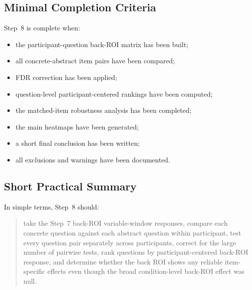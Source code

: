 \subsection{Minimal Completion Criteria}
Step~8 is complete when:
\begin{itemize}
    \item the participant-question back-ROI matrix has been built;
    \item all concrete-abstract item pairs have been compared;
    \item FDR correction has been applied;
    \item question-level participant-centered rankings have been computed;
    \item the matched-item robustness analysis has been completed;
    \item the main heatmaps have been generated;
    \item a short final conclusion has been written;
    \item all exclusions and warnings have been documented.
\end{itemize}

\subsection{Short Practical Summary}
In simple terms, Step~8 should:
\begin{quote}
take the Step~7 back-ROI variable-window responses, compare each concrete question against each abstract
question within participant, test every question pair separately across participants, correct for the
large number of pairwise tests, rank questions by participant-centered back-ROI response, and determine
whether the back ROI shows any reliable item-specific effects even though the broad condition-level
back-ROI effect was null.
\end{quote}